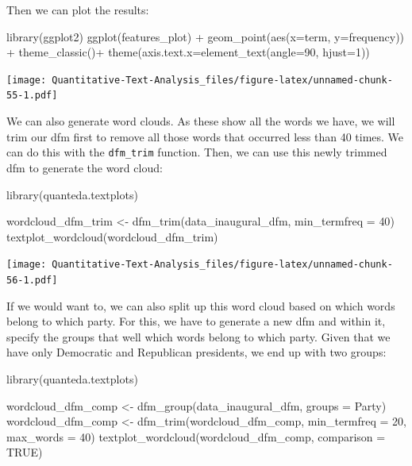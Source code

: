 \documentclass[
]{book}
\newenvironment{Shaded}{\begin{snugshade}}{\end{snugshade}}
\newcommand{\AttributeTok}[1]{\textcolor[rgb]{0.77,0.63,0.00}{#1}}
\newcommand{\ConstantTok}[1]{\textcolor[rgb]{0.00,0.00,0.00}{#1}}
\newcommand{\DecValTok}[1]{\textcolor[rgb]{0.00,0.00,0.81}{#1}}
\newcommand{\FunctionTok}[1]{\textcolor[rgb]{0.00,0.00,0.00}{#1}}
\newcommand{\NormalTok}[1]{#1}
\newcommand{\OtherTok}[1]{\textcolor[rgb]{0.56,0.35,0.01}{#1}}
\newcommand{\SpecialCharTok}[1]{\textcolor[rgb]{0.00,0.00,0.00}{#1}}
\begin{document}
Then we can plot the results:

\begin{Shaded}
\begin{Highlighting}[]
\FunctionTok{library}\NormalTok{(ggplot2)}
\FunctionTok{ggplot}\NormalTok{(features\_plot) }\SpecialCharTok{+} 
 \FunctionTok{geom\_point}\NormalTok{(}\FunctionTok{aes}\NormalTok{(}\AttributeTok{x=}\NormalTok{term, }\AttributeTok{y=}\NormalTok{frequency)) }\SpecialCharTok{+}
 \FunctionTok{theme\_classic}\NormalTok{()}\SpecialCharTok{+}
 \FunctionTok{theme}\NormalTok{(}\AttributeTok{axis.text.x=}\FunctionTok{element\_text}\NormalTok{(}\AttributeTok{angle=}\DecValTok{90}\NormalTok{, }\AttributeTok{hjust=}\DecValTok{1}\NormalTok{))}
\end{Highlighting}
\end{Shaded}

\texttt{[image: Quantitative-Text-Analysis\_files/figure-latex/unnamed-chunk-55-1.pdf]}

We can also generate word clouds. As these show all the words we have, we will trim our dfm first to remove all those words that occurred less than 40 times. We can do this with the \texttt{dfm\_trim} function. Then, we can use this newly trimmed dfm to generate the word cloud:

\begin{Shaded}
\begin{Highlighting}[]
\FunctionTok{library}\NormalTok{(quanteda.textplots)}

\NormalTok{wordcloud\_dfm\_trim }\OtherTok{\textless{}{-}} \FunctionTok{dfm\_trim}\NormalTok{(data\_inaugural\_dfm, }\AttributeTok{min\_termfreq =} \DecValTok{40}\NormalTok{)}
\FunctionTok{textplot\_wordcloud}\NormalTok{(wordcloud\_dfm\_trim)}
\end{Highlighting}
\end{Shaded}

\texttt{[image: Quantitative-Text-Analysis\_files/figure-latex/unnamed-chunk-56-1.pdf]}

If we would want to, we can also split up this word cloud based on which words belong to which party. For this, we have to generate a new dfm and within it, specify the groups that well which words belong to which party. Given that we have only Democratic and Republican presidents, we end up with two groups:

\begin{Shaded}
\begin{Highlighting}[]
\FunctionTok{library}\NormalTok{(quanteda.textplots)}

\NormalTok{wordcloud\_dfm\_comp }\OtherTok{\textless{}{-}} \FunctionTok{dfm\_group}\NormalTok{(data\_inaugural\_dfm, }\AttributeTok{groups =}\NormalTok{ Party)}
\NormalTok{wordcloud\_dfm\_comp }\OtherTok{\textless{}{-}} \FunctionTok{dfm\_trim}\NormalTok{(wordcloud\_dfm\_comp, }\AttributeTok{min\_termfreq =} \DecValTok{20}\NormalTok{,}
    \AttributeTok{max\_words =} \DecValTok{40}\NormalTok{)}
\FunctionTok{textplot\_wordcloud}\NormalTok{(wordcloud\_dfm\_comp, }\AttributeTok{comparison =} \ConstantTok{TRUE}\NormalTok{)}
\end{Highlighting}
\end{Shaded}
\end{document}
